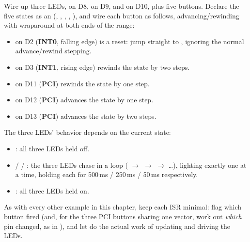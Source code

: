 Wire up three LEDs,  on D8,  on D9, and  on D10, plus five
buttons. Declare the five states as an  (, ,
, , ), and wire each button as follows,
advancing/rewinding with wraparound at both ends of the range:
\begin{itemize}
  \item {} on D2 (\textbf{INT0}, falling edge) is a reset: jump straight to
    , ignoring the normal advance/rewind stepping.
  \item {} on D3 (\textbf{INT1}, rising edge) rewinds the state by two steps.
  \item {} on D11 (\textbf{PCI}) rewinds the state by one step.
  \item {} on D12 (\textbf{PCI}) advances the state by one step.
  \item {} on D13 (\textbf{PCI}) advances the state by two steps.
\end{itemize}
The three LEDs' behavior depends on the current state:
\begin{itemize}
  \item {}: all three LEDs held off.
  \item {} /  / : the three LEDs chase in a loop
    ( $\rightarrow$  $\rightarrow$  $\rightarrow$ 
    \ldots), lighting exactly one at a time, holding each for 500\,ms / 250\,ms / 50\,ms
    respectively.
  \item {}: all three LEDs held on.
\end{itemize}
As with every other example in this chapter, keep each ISR minimal: flag which button fired (and,
for the three PCI buttons sharing one vector, work out \emph{which} pin changed, as in
), and let  do the actual work of updating  and
driving the LEDs.

